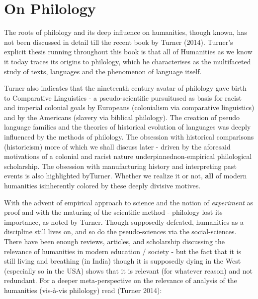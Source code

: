 \section*{On Philology}

The roots of philology and its deep influence on humanities, though known, has not been discussed in detail till the recent book by Turner (2014). Turner’s explicit thesis running throughout this book is that all of Humanities as we know it today traces its origins to philology, which he characterises as the multifaceted study of texts, languages and the phenomenon of language itself.

Turner also indicates that the nineteenth century avatar of philology gave birth to Comparative Linguistics - a pseudo-scientific pursuit\break used as basis for racist and imperial colonial goals by Europeans (colonialism via comparative linguistics) and by the Americans (slavery via biblical philology). The creation of pseudo language families and the theories of historical evolution of languages was deeply influenced by the methods of philology. The obsession with historical comparisons (historicism) more of which we shall discuss later - driven by the aforesaid motivations of a colonial and racist nature underpinned\break non-empirical philological scholarship. The obsession with manufacturing history and interpreting past events is also highlighted by\break Turner. Whether we realize it or not, \textbf{all} of modern humanities is\break inherently colored by these deeply divisive motives.

\newpage

With the advent of empirical approach to science and the notion of \textit{experiment} as proof and with the maturing of the scientific method - philology lost its importance, as noted by Turner. Though supposedly defeated, humanities as a discipline still lives on, and so do the pseudo-sciences via the social-sciences. There have been enough reviews, articles, and scholarship discussing the relevance of humanities in modern education / society - but the fact that it is still living and breathing (in India) though it is supposedly dying in the West (especially so in the USA) shows that it is relevant (for whatever reason) and not redundant. For a deeper meta-perspective on the relevance of analysis of the humanities (vis-à-vis philology) read (Turner 2014):


